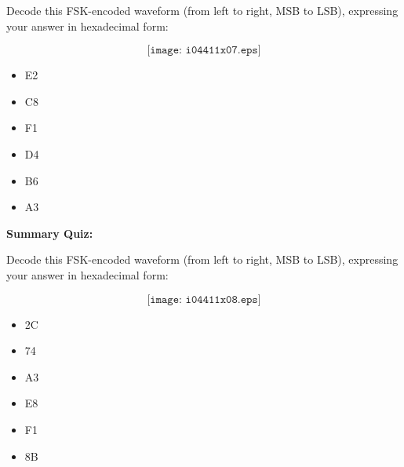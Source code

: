Decode this FSK-encoded waveform (from left to right, MSB to LSB), expressing your answer in hexadecimal form:

$$\texttt{[image: i04411x07.eps]}$$

\begin{itemize}
\item{} E2
\vskip 5pt 
\item{} C8
\vskip 5pt 
\item{} F1
\vskip 5pt 
\item{} D4
\vskip 5pt 
\item{} B6
\vskip 5pt 
\item{} A3
\end{itemize}





\vfil \eject

\noindent
{\bf Summary Quiz:}

Decode this FSK-encoded waveform (from left to right, MSB to LSB), expressing your answer in hexadecimal form:

$$\texttt{[image: i04411x08.eps]}$$

\begin{itemize}
\item{} 2C
\vskip 5pt 
\item{} 74
\vskip 5pt 
\item{} A3
\vskip 5pt 
\item{} E8
\vskip 5pt 
\item{} F1
\vskip 5pt 
\item{} 8B
\end{itemize}








